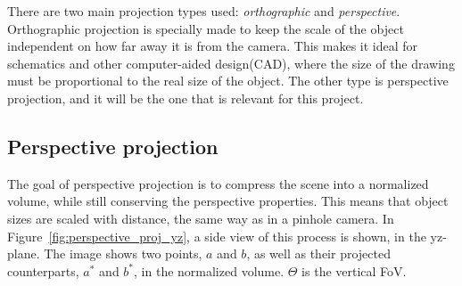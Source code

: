 There are two main projection types used: \emph{orthographic} and \emph{perspective}. Orthographic projection is specially made to keep the scale of the object independent on how far away it is from the camera. This makes it ideal for schematics and other computer-aided design(CAD), where the size of the drawing must be proportional to the real size of the object. The other type is perspective projection, and it will be the one that is relevant for this project.

\subsection{Perspective projection}

The goal of perspective projection is to compress the scene into a normalized volume, while still conserving the perspective properties. This means that object sizes are scaled with distance, the same way as in a pinhole camera. In Figure~\ref{fig:perspective_proj_yz}, a side view of this process is shown, in the yz-plane. The image shows two points, $a$ and $b$, as well as their projected counterparts, $a^*$ and $b^*$, in the normalized volume. $\Theta$ is the vertical FoV.

